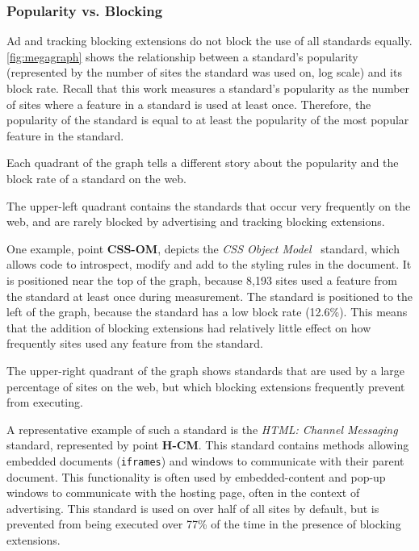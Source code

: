 \subsubsection{Popularity vs. Blocking}
\label{sec:results-feature-popularity}

Ad and tracking blocking extensions do not block the use of all standards
equally.  \ref{fig:megagraph} shows the relationship between a standard's
popularity (represented by the number of sites the standard was used on, log
scale) and its block rate.  Recall that this work measures a standard's
popularity as the number of sites where a feature in a standard is used at
least once.  Therefore, the popularity of the standard is equal to at least the
popularity of the most popular feature in the standard.

Each quadrant of the graph tells a different story about the popularity and the
block rate of a standard on the web.

The upper-left quadrant contains the standards that occur very frequently on
the web, and are rarely blocked by advertising and tracking blocking
extensions.

One example, point \textbf{CSS-OM}, depicts the \textit{CSS Object
Model}~\cite{cssomw3c} standard, which allows \JS code to introspect, modify
and add to the styling rules in the document.  It is positioned near the top of
the graph, because 8,193 sites used a feature from the standard at least once
during measurement.  The standard is positioned to the left of the graph,
because the standard has a low block rate (12.6\%). This means that the addition
of blocking extensions had relatively little effect on how frequently sites
used any feature from the standard.

The upper-right quadrant of the graph shows standards that are used by a large
percentage of sites on the web, but which blocking extensions frequently
prevent from executing.

A representative example of such a standard is the \textit{HTML: Channel
Messaging} ~\cite{htmlcmw3c} standard, represented by point \textbf{H-CM}.
This standard contains \JS methods allowing embedded documents
(\texttt{iframes}) and windows to communicate with their parent document.  This
functionality is often used by embedded-content and pop-up windows to
communicate with the hosting page, often in the context of advertising.  This
standard is used on over half of all sites by default, but is prevented from
being executed over 77\% of the time in the presence of blocking extensions.

